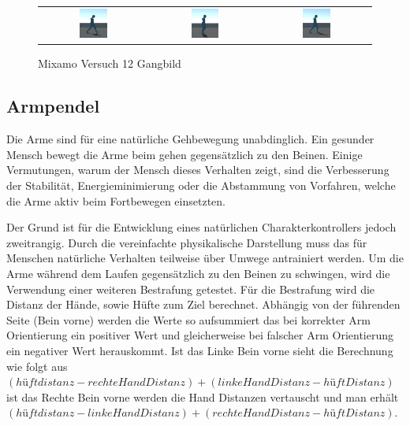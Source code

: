 \begin{figure}[H]
\begin{tabular}{ccc}
    \includegraphics[width=0.27\textwidth]{img/charakter_mixamo_laufen_energiespar4}  & \includegraphics[width=0.27\textwidth]{img/charakter_mixamo_laufen_energiespar5}  & \includegraphics[width=0.27\textwidth]{img/charakter_mixamo_laufen_energiespar6} \\
  \end{tabular}
  \caption{Mixamo Versuch 12 Gangbild}
  \label{fig:mixamo_versuch12_gangbild}
\end{figure}

\subsection{Armpendel}
Die Arme sind für eine natürliche Gehbewegung unabdinglich. Ein gesunder Mensch bewegt die Arme beim gehen gegensätzlich zu den Beinen. Einige Vermutungen, warum der Mensch dieses Verhalten zeigt, sind die Verbesserung der Stabilität, Energieminimierung oder die Abstammung von Vorfahren, welche die Arme aktiv beim Fortbewegen einsetzten.\cite{meyns2013and}

Der Grund ist für die Entwicklung eines natürlichen Charakterkontrollers jedoch zweitrangig. Durch die vereinfachte physikalische Darstellung muss das für Menschen natürliche Verhalten teilweise über Umwege antrainiert werden. Um die Arme während dem Laufen gegensätzlich zu den Beinen zu schwingen, wird die Verwendung einer weiteren Bestrafung getestet. Für die Bestrafung wird die Distanz der Hände, sowie Hüfte zum Ziel berechnet. Abhängig von der führenden Seite (Bein vorne) werden die Werte so aufsummiert das bei korrekter Arm Orientierung ein positiver Wert und gleicherweise bei falscher Arm Orientierung ein negativer Wert herauskommt. Ist das Linke Bein vorne sieht die Berechnung wie folgt aus $(hüftdistanz - rechteHandDistanz) + (linkeHandDistanz - hüftDistanz)$ ist das Rechte Bein vorne werden die Hand Distanzen vertauscht und man erhält $(hüftdistanz - linkeHandDistanz) + (rechteHandDistanz - hüftDistanz)$.

